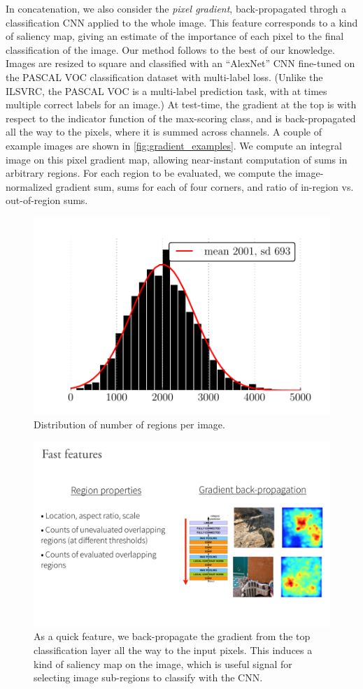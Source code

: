In concatenation, we also consider the \emph{pixel gradient}, back-propagated throgh a classification CNN applied to the whole image.
This feature corresponds to a kind of saliency map, giving an estimate of the importance of each pixel to the final classification of the image.
Our method follows \cite{Simonyan-ICLR-2014} to the best of our knowledge.
Images are resized to square and classified with an ``AlexNet'' \cite{Krizhevsky-NIPS-2012} CNN fine-tuned on the PASCAL VOC classification dataset with multi-label loss.
(Unlike the ILSVRC, the PASCAL VOC is a multi-label prediction task, with at times multiple correct labels for an image.)
At test-time, the gradient at the top is with respect to the indicator function of the max-scoring class, and is back-propagated all the way to the pixels, where it is summed across channels.
A couple of example images are shown in \autoref{fig:gradient_examples}.
We compute an integral image on this pixel gradient map, allowing near-instant computation of sums in arbitrary regions.
For each region to be evaluated, we compute the image-normalized gradient sum, sums for each of four corners, and ratio of in-region vs. out-of-region sums.

\begin{figure}
\centering
\includegraphics[width=.66\linewidth]{../ccnn/figures/roi_hist.pdf}
\caption{
Distribution of number of regions per image.
}\label{fig:roi_hist}
\end{figure}

\begin{figure}
\centering
\includegraphics[width=.66\linewidth]{../../figures/gradient_backprop.pdf}
\caption[Explanation of the gradient back-propagation quick feature.]{
As a quick feature, we back-propagate the gradient from the top classification layer all the way to the input pixels.
This induces a kind of saliency map on the image, which is useful signal for selecting image sub-regions to classify with the CNN.
}\label{fig:gradient_examples}
\end{figure}

